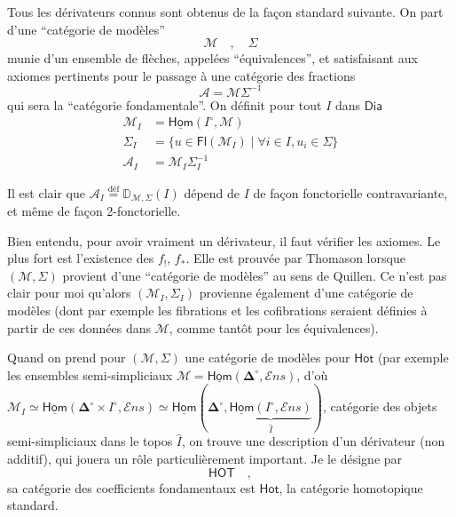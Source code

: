 \documentclass[11pt]{article}
\newcommand{\printedpage}[1]{\marginpar{\footnotesize p.~#1}}
\newcommand{\msp}[1]{\marginpar{\footnotesize [#1]}}
\newcommand{\DD}{\mathbb{D}}
\newcommand{\uHom}{\underline{\mathsf{Hom}}}
\newcommand{\Dia}{\mathsf{Dia}}
\newcommand{\Ens}{\mathcal{E}ns}
\newcommand{\bDelta}{\boldsymbol{\Delta}}
\newcommand{\defeq}{\overset{\text{déf}}{=}}
\begin{document}
Tous les dérivateurs connus sont obtenus de la façon standard suivante. On part d’une “catégorie de modèles”
\[
\mathcal{M} \quad , \quad \Sigma
\]
munie d’un ensemble de flèches, appelées “équivalences”, et satisfaisant aux axiomes pertinents pour le passage à une catégorie des fractions
\[
\mathcal{A} = \mathcal{M}\Sigma^{-1}
\]
qui sera la “catégorie fondamentale”. On définit pour tout $I$ dans $\Dia$
\[
\begin{aligned}
\mathcal{M}_I &= \uHom(I^\circ,\mathcal{M}) \\
\Sigma_I &= \{u \in \mathsf{Fl}(\mathcal{M}_I) \mid \forall i \in I, u_i \in \Sigma\} \\
\mathcal{A}_I &= \mathcal{M}_I\Sigma_I^{-1}
\end{aligned}
\]

\noindent\msp{page 13}Il est clair que $\mathcal{A}_I \defeq \DD_{\mathcal{M},\Sigma}(I)$ dépend de $I$ de façon fonctorielle contravariante, et même de façon 2-fonctorielle.

Bien entendu, pour avoir vraiment un dérivateur, il faut vérifier les axiomes. Le plus fort est l’existence des $f_!$, $f_*$. Elle est prouvée par Thomason lorsque $(\mathcal{M},\Sigma)$ provient d’une “catégorie de modèles” au sens de Quillen. Ce n’est pas clair pour moi qu’alors $(\mathcal{M}_I,\Sigma_I)$ provienne également d’une catégorie de modèles (dont par exemple les fibrations \printedpage{11}%
et les cofibrations seraient définies à partir de ces données dans $\mathcal{M}$, comme tantôt pour les équivalences).

Quand on prend pour $(\mathcal{M},\Sigma)$ une catégorie de modèles pour $\mathsf{Hot}$ (par exemple les ensembles semi-simpliciaux $\mathcal{M} = \uHom(\bDelta^\circ,\Ens)$, d’où $\mathcal{M}_I \simeq \uHom(\bDelta^\circ \times I^\circ,\Ens) \simeq \uHom(\bDelta^\circ,\underbrace{\uHom(I^\circ,\Ens)}_{\widehat{I}})$, catégorie des objets semi-simpliciaux dans le topos $\widehat{I}$, on trouve une description d’un dérivateur (non additif), qui jouera un rôle particulièrement important. Je le désigne par %
\[
\mathsf{HOT} \quad ,
\]
sa catégorie des coefficients fondamentaux est $\mathsf{Hot}$, la catégorie homotopique standard.
\end{document}
